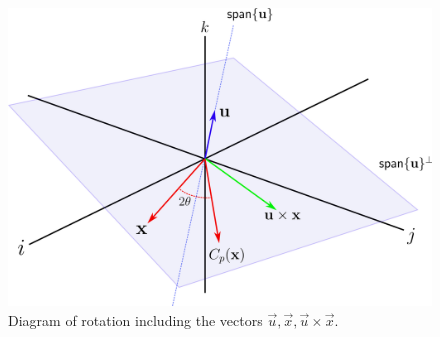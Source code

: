 \begin{figure}
    \centering
    \includegraphics[width=0.8\linewidth]{quaternion.png}
    \caption{Diagram of rotation including the vectors $\vec{u},\vec{x},\vec{u}\times\vec{x}$.}
    \label{fig:quaternion}
\end{figure}

